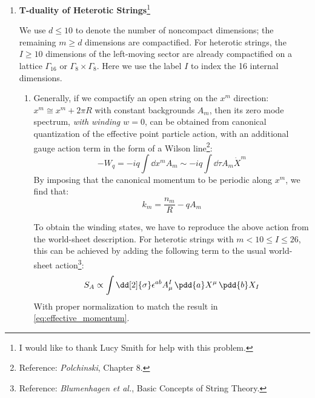 \documentclass[a4paper,10pt]{article}
\begin{document}
\maketitle
\pagestyle{headings}
\thispagestyle{empty}

\begin{enumerate}

\item \textbf{T-duality of Heterotic Strings}\footnote{
		I would like to thank Lucy Smith for help with this problem. 
	}
	
	We use $d \le 10$ to denote the number of noncompact dimensions; the remaining $m \ge d$ dimensions are compactified. For heterotic strings, the $I\ge 10$ dimensions of the left-moving sector are already compactified on a lattice $\Gamma_{16}$ or $\Gamma_8\times \Gamma_8$. Here we use the label $I$ to index the 16 internal dimensions. 
	
	\begin{enumerate}
	\item Generally, if we compactify an open string on the $x^m$ direction: $x^m \cong x^m + 2\pi R$ with constant backgrounds $A_m$, then its zero mode spectrum, \textit{with winding $w = 0$}, can be obtained from canonical quantization of the effective point particle action, with an additional gauge action term in the form of a Wilson line\footnote{
		Reference: \textit{Polchinski}, Chapter 8. 
	}:
	\begin{equation}
		-W_q
		= -iq \int \dd{x^m} A_m
		\sim -iq \int \dd{\tau} A_m \dot{X}^m
	\end{equation}
	By imposing that the canonical momentum to be periodic along $x^m$, we find that:
	\begin{equation}
		k_m = \frac{n_m}{R} - q A_m
	\label{eq:effective_momentum}
	\end{equation}
	
	To obtain the winding states, we have to reproduce the above action from the world-sheet description. For heterotic strings with $m < 10 \le I \le 26$, this can be achieved by adding the following term to the usual world-sheet action\footnote{
		Reference: \textit{Blumenhagen et al.}, Basic Concepts of String Theory. 
	}:
	\begin{equation}
		S_A \propto \int \dd[2]{\sigma}
			\epsilon^{ab} A^I_\mu
			\,\pdd{a} X^\mu
			\,\pdd{b} X_I
	\end{equation}
	With proper normalization to match the result in \eqref{eq:effective_momentum}. 
	

\end{enumerate}
\end{enumerate}
\end{document}
